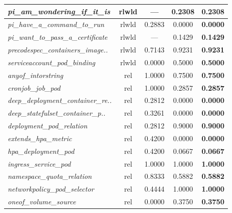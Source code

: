 \begin{footnotesize}
\begin{longtable}{|p{3.6cm}|c|c|c|c|}
\hline
\textit{pi\_\allowbreak{}am\_\allowbreak{}wondering\_\allowbreak{}if\_\allowbreak{}it\_\allowbreak{}is} & rlwld & --- & 0.2308 & \textbf{0.2308} \\
\hline
\textit{pi\_\allowbreak{}have\_\allowbreak{}a\_\allowbreak{}command\_\allowbreak{}to\_\allowbreak{}run} & rlwld & 0.2883 & 0.0000 & \textbf{0.0000} \\
\hline
\textit{pi\_\allowbreak{}want\_\allowbreak{}to\_\allowbreak{}pass\_\allowbreak{}a\_\allowbreak{}certificate} & rlwld & --- & 0.1429 & \textbf{0.1429} \\
\hline
\textit{precodespec\_\allowbreak{}containers\_\allowbreak{}image..} & rlwld & 0.7143 & 0.9231 & \textbf{0.9231} \\
\hline
\textit{serviceaccount\_\allowbreak{}pod\_\allowbreak{}binding} & rlwld & 0.0000 & 0.5000 & \textbf{0.5000} \\
\hline
\textit{anyof\_\allowbreak{}intorstring} & rel & 1.0000 & 0.7500 & \textbf{0.7500} \\
\hline
\textit{cronjob\_\allowbreak{}job\_\allowbreak{}pod} & rel & 1.0000 & 0.2857 & \textbf{0.2857} \\
\hline
\textit{deep\_\allowbreak{}deployment\_\allowbreak{}container\_\allowbreak{}re..} & rel & 0.2812 & 0.0000 & \textbf{0.0000} \\
\hline
\textit{deep\_\allowbreak{}statefulset\_\allowbreak{}container\_\allowbreak{}p..} & rel & 0.3261 & 0.0000 & \textbf{0.0000} \\
\hline
\textit{deployment\_\allowbreak{}pod\_\allowbreak{}relation} & rel & 0.2812 & 0.9000 & \textbf{0.9000} \\
\hline
\textit{extends\_\allowbreak{}hpa\_\allowbreak{}metric} & rel & 0.4200 & 0.0000 & \textbf{0.0000} \\
\hline
\textit{hpa\_\allowbreak{}deployment\_\allowbreak{}pod} & rel & 0.4200 & 0.0667 & \textbf{0.0667} \\
\hline
\textit{ingress\_\allowbreak{}service\_\allowbreak{}pod} & rel & 1.0000 & 1.0000 & \textbf{1.0000} \\
\hline
\textit{namespace\_\allowbreak{}quota\_\allowbreak{}relation} & rel & 0.8333 & 0.5882 & \textbf{0.5882} \\
\hline
\textit{networkpolicy\_\allowbreak{}pod\_\allowbreak{}selector} & rel & 0.4444 & 1.0000 & \textbf{1.0000} \\
\hline
\textit{oneof\_\allowbreak{}volume\_\allowbreak{}source} & rel & 0.0000 & 0.3750 & \textbf{0.3750} \\
\hline

\end{longtable}
\end{footnotesize}
